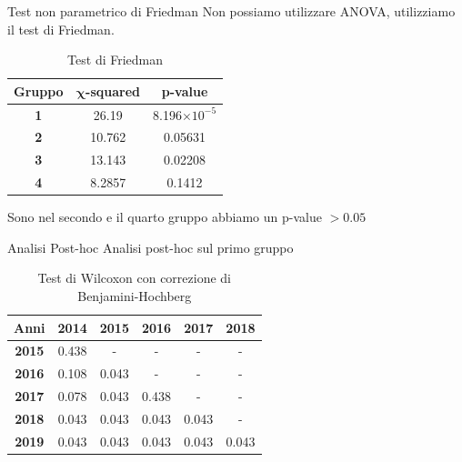 \documentclass{beamer}
\begin{document}
\begin{frame}{Test non parametrico di Friedman}
	Non possiamo utilizzare ANOVA, utilizziamo il test di Friedman.
	\begin{table}[htbp]
		\captionsetup{labelformat=empty} %
		\caption{Test di Friedman}
		\begin{center}
		\begin{tabular}{|c|c|c|}
		\hline
		\textbf{Gruppo} & $\boldsymbol{\chi}$\textbf{-squared} & \textbf{p-value} \\
		\hline
		\textbf{1} & 26.19 & 8.196$\times 10^{-5}$ \\\cline{1-3}
		\textbf{2} & 10.762 & 0.05631 \\\cline{1-3}
		\textbf{3} & 13.143 & 0.02208 \\\cline{1-3}
		\textbf{4} & 8.2857 & 0.1412 \\\cline{1-3}
		\hline
		\end{tabular}
		\label{tab5}
		\end{center}
	\end{table}
	Sono nel secondo e il quarto gruppo abbiamo un p-value $> 0.05$
\end{frame}

\begin{frame}{Analisi Post-hoc}
	Analisi post-hoc sul primo gruppo 
	\begin{table}[htbp]
		\captionsetup{labelformat=empty} %
		\caption{Test di Wilcoxon con correzione di Benjamini-Hochberg}
		\begin{center}
		\begin{tabular}{|c|c|c|c|c|c|}
		\hline
		\textbf{Anni} & \textbf{2014} & \textbf{2015} & \textbf{2016} & \textbf{2017} & \textbf{2018} \\
		\hline
		\textbf{2015} & 0.438 & - & - & - & - \\ \hline
		\textbf{2016} & 0.108 & 0.043 & - & - & - \\ \hline
		\textbf{2017} & 0.078 & 0.043 & 0.438 & - & - \\ \hline
		\textbf{2018} & 0.043 & 0.043 & 0.043 & 0.043 & - \\ \hline
		\textbf{2019} & 0.043 & 0.043 & 0.043 & 0.043 & 0.043 \\ 
		\hline
		\end{tabular}
		\label{tab6}
		\end{center}
	\end{table}
\end{frame}
\end{document}
